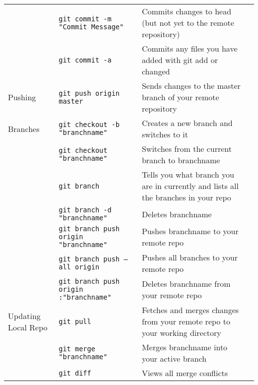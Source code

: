 \documentclass[11pt, letterpaper]{article}
\begin{document}
\begin{table}[!htb]
\begin{center}
\begin{tabular}{p{2cm}|l|p{4cm} l}
					& \texttt{git commit -m "Commit Message"} & Commits changes to head (but not yet to the remote repository) \\\cmidrule{2-3}

					& \texttt{git commit -a} & Commits any files you have added with git add or changed \\

					\midrule
					Pushing

					& \texttt{git push origin master} & Sends changes to the master branch of your remote repository \\

					\midrule
					Branches

					& \texttt{git checkout -b "branchname"} & Creates a new branch and switches to it \\\cmidrule{2-3}

					& \texttt{git checkout "branchname"} & Switches from the current branch to branchname \\\cmidrule{2-3}

					& \texttt{git branch} & Tells you what branch you are in currently and lists all the branches in your repo \\\cmidrule{2-3}

					& \texttt{git branch -d "branchname"} & Deletes branchname \\\cmidrule{2-3}

					& \texttt{git branch push origin "branchname"} & Pushes branchname to your remote repo \\\cmidrule{2-3}

					& \texttt{git branch push --all origin} & Pushes all branches to your remote repo \\\cmidrule{2-3}

					& \texttt{git branch push origin :"branchname"} & Deletes branchname from your remote repo \\

					\midrule
					Updating Local Repo

					& \texttt{git pull} & Fetches and merges changes from your remote repo to your working directory \\\cmidrule{2-3}
					
					& \texttt{git merge "branchname"} & Merges branchname into your active branch \\\cmidrule{2-3}

					& \texttt{git diff} & Views all merge conflicts \\

					\bottomrule
				\end{tabular}
				\hspace*{-2cm}
			\end{center}
		\end{table}
\end{document}
